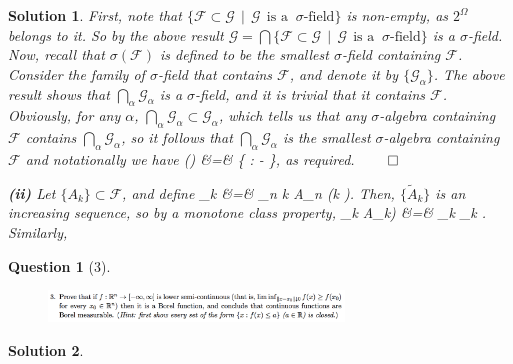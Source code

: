 \documentclass{article} %
\def\eQb#1\eQe{\begin{eqnarray*}#1\end{eqnarray*}}
\theoremstyle{quest}
\newtheorem*{question}{Question}
\newtheorem*{solution}{Solution}
\begin{document}
\begin{solution}
First, note that $\{\mathscr{F} \subset \mathscr{G} \>\> | \>\>
\mathscr{G} \>\> \text{is a } \> \sigma \text{-field} \}$ 
is non-empty, as $2^{\Omega}$ 
belongs to it. So by the above result $
\mathscr{G} = \bigcap \{ \mathscr{F} \subset \mathscr{G} \>\> | \>\> 
\mathscr{G} \>\> \text{is a } \> \sigma \text{-field} \}$ is a $\sigma$-field.
Now, recall that $\sigma(\mathscr{F})$ is defined to be the smallest $\sigma$-field
containing $\mathscr{F}$. Consider the family of $\sigma$-field that contains 
$\mathscr{F}$, and denote it by $\{ \mathscr{G}_\alpha \}$.  
The above result shows that $\bigcap_{\alpha} 
\mathscr{G}_{\alpha}$ is a $\sigma$-field, and it is trivial that it contains
$\mathscr{F}$. Obviously, for any $\alpha$, $
\bigcap_{\alpha} \mathscr{G}_\alpha \subset \mathscr{G}_{\alpha}$, 
which tells us that any $\sigma$-algebra
containing $\mathscr{F}$ contains $\bigcap_{\alpha} 
\mathscr{G}_{\alpha}$, so it follows that
$\bigcap_{\alpha} \mathscr{G}_{\alpha}$ is the smallest $\sigma$-algebra containing
$\mathscr{F}$ and notationally we have 
\eQb
\sigma() &=& \{  \subset {} :  \> 
 \sigma- \},
\eQe 
as required. \hfill $\qed$ 

\bigskip

\textbf{(ii)} Let $\{A_k\} \subset \mathscr{F}$, and define
\eQb
\tilde{A}_k &=& \bigcup_{n \leq k} A_n \>\>\> (k ). 
\eQe 
Then, $\{\tilde{A}_k\}$ is an increasing sequence, so by a monotone class property,
\eQb
\bigcup_k A_k) &=& \bigcup_k _k \in {}.
\eQe
Similarly, 

\end{solution}

\newpage

\begin{question}[3]
\hfill
\begin{figure}[h!]
  \centering
    \includegraphics[width=0.7\textwidth]{problim-e1-p3.png}
\end{figure}
\end{question}
\begin{solution} \hfill \\

\end{solution}

\newpage 
\end{document}
